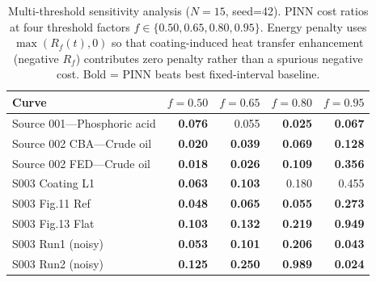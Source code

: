 \documentclass[review]{elsarticle}
\begin{document}
\begin{table}[htbp]
\centering
\caption{Multi-threshold sensitivity analysis ($N=15$, seed=42). PINN cost ratios at four threshold factors $f \in \{0.50, 0.65, 0.80, 0.95\}$. Energy penalty uses $\max(R_f(t), 0)$ so that coating-induced heat transfer enhancement (negative $R_f$) contributes zero penalty rather than a spurious negative cost. Bold = PINN beats best fixed-interval baseline.}
\label{tab:economic_sensitivity}
\begin{tabular}{@{}p{3.2cm}rrrr@{}}
\toprule
Curve & $f{=}0.50$ & $f{=}0.65$ & $f{=}0.80$ & $f{=}0.95$ \\
\midrule
Source 001---Phosphoric acid & \textbf{0.076} & 0.055 & \textbf{0.025} & \textbf{0.067} \\
Source 002 CBA---Crude oil & \textbf{0.020} & \textbf{0.039} & \textbf{0.069} & \textbf{0.128} \\
Source 002 FED---Crude oil & \textbf{0.018} & \textbf{0.026} & \textbf{0.109} & \textbf{0.356} \\
S003 Coating L1 & \textbf{0.063} & \textbf{0.103} & 0.180 & 0.455 \\
S003 Fig.11 Ref & \textbf{0.048} & \textbf{0.065} & \textbf{0.055} & \textbf{0.273} \\
S003 Fig.13 Flat & \textbf{0.103} & \textbf{0.132} & \textbf{0.219} & \textbf{0.949} \\
S003 Run1 (noisy) & \textbf{0.053} & \textbf{0.101} & \textbf{0.206} & \textbf{0.043} \\
S003 Run2 (noisy) & \textbf{0.125} & \textbf{0.250} & \textbf{0.989} & \textbf{0.024} \\
\bottomrule
\end{tabular}
\end{table}
\end{document}
